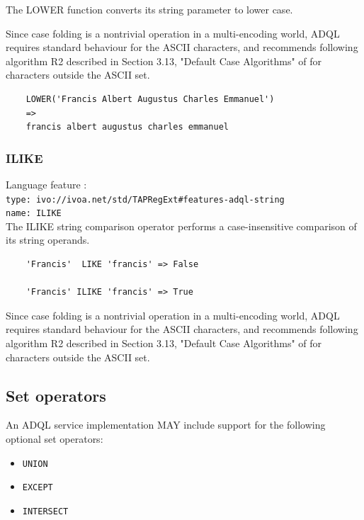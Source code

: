 \documentclass[11pt,a4paper]{ivoa}
\begin{document}
The LOWER function converts its string parameter to lower case.

Since case folding is a nontrivial operation in a multi-encoding world,
ADQL requires standard behaviour for the ASCII characters, and recommends
following algorithm R2 described in Section 3.13, "Default Case Algorithms"
of \citet{std:UNICODE} for characters outside the ASCII set.

\begin{verbatim}
    LOWER('Francis Albert Augustus Charles Emmanuel')
    =>
    francis albert augustus charles emmanuel
\end{verbatim}

\subsubsection{ILIKE}
\label{sec:string.functions.ilike}
{\footnotesize Language feature :}\\
{\footnotesize \verb|type: ivo://ivoa.net/std/TAPRegExt#features-adql-string|}\\
{\footnotesize \verb|name: ILIKE|}\\

The ILIKE string comparison operator performs a case-insensitive comparison
of its string operands.

\begin{verbatim}
    'Francis'  LIKE 'francis' => False

    'Francis' ILIKE 'francis' => True
\end{verbatim}

Since case folding is a nontrivial operation in a multi-encoding world,
ADQL requires standard behaviour for the ASCII characters, and recommends
following algorithm R2 described in Section 3.13, "Default Case Algorithms"
of \citet{std:UNICODE} for characters outside the ASCII set.

\subsection{Set operators}
\label{sec:set.operators}

An ADQL service implementation MAY include support for the following optional
set operators:

\begin{itemize}
    \item \verb:UNION:
    \item \verb:EXCEPT:
    \item \verb:INTERSECT:
\end{itemize}
\end{document}
